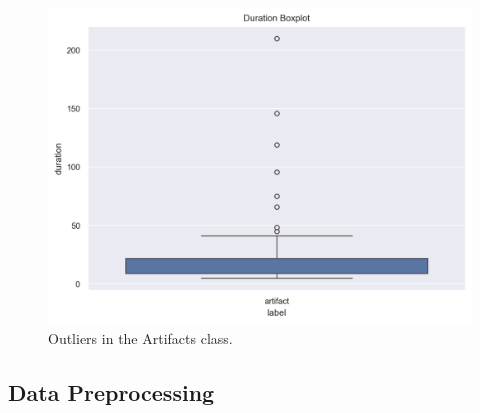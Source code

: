 \begin{figure}[H]
	\centering
	\includegraphics[width=1\columnwidth]{./images/DataExp_outliers_artifact.png}
	\caption{Outliers in the Artifacts class.}
	\label{fig:DataExp_outliers_Artifacts}
 \end{figure}\subsection{Data Preprocessing}
